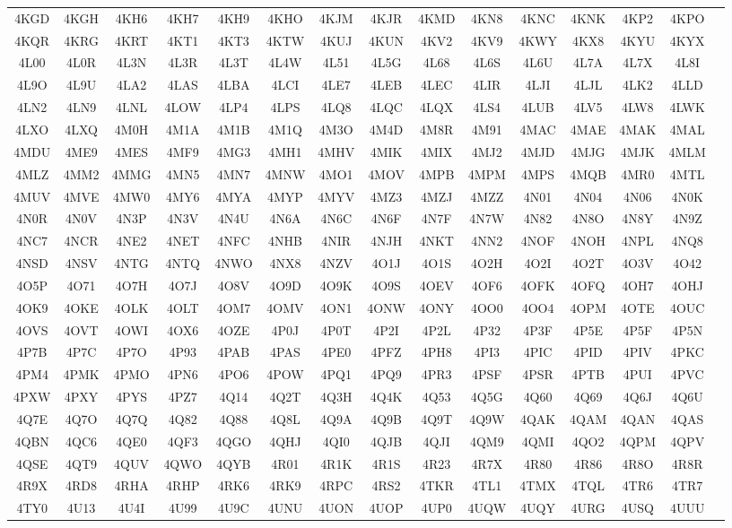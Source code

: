 \begin{longtable}{ c c c c c c c c c c c c c c c }
	4KGD & 4KGH & 4KH6 & 4KH7 & 4KH9 & 4KHO & 4KJM & 4KJR & 4KMD & 4KN8 & 4KNC & 4KNK & 4KP2 & 4KPO  \\
	4KQR & 4KRG & 4KRT & 4KT1 & 4KT3 & 4KTW & 4KUJ & 4KUN & 4KV2 & 4KV9 & 4KWY & 4KX8 & 4KYU & 4KYX  \\
	4L00 & 4L0R & 4L3N & 4L3R & 4L3T & 4L4W & 4L51 & 4L5G & 4L68 & 4L6S & 4L6U & 4L7A & 4L7X & 4L8I  \\
	4L9O & 4L9U & 4LA2 & 4LAS & 4LBA & 4LCI & 4LE7 & 4LEB & 4LEC & 4LIR & 4LJI & 4LJL & 4LK2 & 4LLD  \\
	4LN2 & 4LN9 & 4LNL & 4LOW & 4LP4 & 4LPS & 4LQ8 & 4LQC & 4LQX & 4LS4 & 4LUB & 4LV5 & 4LW8 & 4LWK  \\
	4LXO & 4LXQ & 4M0H & 4M1A & 4M1B & 4M1Q & 4M3O & 4M4D & 4M8R & 4M91 & 4MAC & 4MAE & 4MAK & 4MAL  \\
	4MDU & 4ME9 & 4MES & 4MF9 & 4MG3 & 4MH1 & 4MHV & 4MIK & 4MIX & 4MJ2 & 4MJD & 4MJG & 4MJK & 4MLM  \\
	4MLZ & 4MM2 & 4MMG & 4MN5 & 4MN7 & 4MNW & 4MO1 & 4MOV & 4MPB & 4MPM & 4MPS & 4MQB & 4MR0 & 4MTL  \\
	4MUV & 4MVE & 4MW0 & 4MY6 & 4MYA & 4MYP & 4MYV & 4MZ3 & 4MZJ & 4MZZ & 4N01 & 4N04 & 4N06 & 4N0K  \\
	4N0R & 4N0V & 4N3P & 4N3V & 4N4U & 4N6A & 4N6C & 4N6F & 4N7F & 4N7W & 4N82 & 4N8O & 4N8Y & 4N9Z  \\
	4NC7 & 4NCR & 4NE2 & 4NET & 4NFC & 4NHB & 4NIR & 4NJH & 4NKT & 4NN2 & 4NOF & 4NOH & 4NPL & 4NQ8  \\
	4NSD & 4NSV & 4NTG & 4NTQ & 4NWO & 4NX8 & 4NZV & 4O1J & 4O1S & 4O2H & 4O2I & 4O2T & 4O3V & 4O42  \\
	4O5P & 4O71 & 4O7H & 4O7J & 4O8V & 4O9D & 4O9K & 4O9S & 4OEV & 4OF6 & 4OFK & 4OFQ & 4OH7 & 4OHJ  \\
	4OK9 & 4OKE & 4OLK & 4OLT & 4OM7 & 4OMV & 4ON1 & 4ONW & 4ONY & 4OO0 & 4OO4 & 4OPM & 4OTE & 4OUC  \\
	4OVS & 4OVT & 4OWI & 4OX6 & 4OZE & 4P0J & 4P0T & 4P2I & 4P2L & 4P32 & 4P3F & 4P5E & 4P5F & 4P5N  \\
	4P7B & 4P7C & 4P7O & 4P93 & 4PAB & 4PAS & 4PE0 & 4PFZ & 4PH8 & 4PI3 & 4PIC & 4PID & 4PIV & 4PKC  \\
	4PM4 & 4PMK & 4PMO & 4PN6 & 4PO6 & 4POW & 4PQ1 & 4PQ9 & 4PR3 & 4PSF & 4PSR & 4PTB & 4PUI & 4PVC  \\
	4PXW & 4PXY & 4PYS & 4PZ7 & 4Q14 & 4Q2T & 4Q3H & 4Q4K & 4Q53 & 4Q5G & 4Q60 & 4Q69 & 4Q6J & 4Q6U  \\
	4Q7E & 4Q7O & 4Q7Q & 4Q82 & 4Q88 & 4Q8L & 4Q9A & 4Q9B & 4Q9T & 4Q9W & 4QAK & 4QAM & 4QAN & 4QAS  \\
	4QBN & 4QC6 & 4QE0 & 4QF3 & 4QGO & 4QHJ & 4QI0 & 4QJB & 4QJI & 4QM9 & 4QMI & 4QO2 & 4QPM & 4QPV  \\
	4QSE & 4QT9 & 4QUV & 4QWO & 4QYB & 4R01 & 4R1K & 4R1S & 4R23 & 4R7X & 4R80 & 4R86 & 4R8O & 4R8R  \\
	4R9X & 4RD8 & 4RHA & 4RHP & 4RK6 & 4RK9 & 4RPC & 4RS2 & 4TKR & 4TL1 & 4TMX & 4TQL & 4TR6 & 4TR7  \\
	4TY0 & 4U13 & 4U4I & 4U99 & 4U9C & 4UNU & 4UON & 4UOP & 4UP0 & 4UQW & 4UQY & 4URG & 4USQ & 4UUU  \\
	\end{longtable}	
